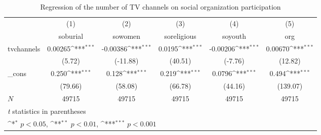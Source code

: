 \begin{table}[htbp]\centering
\def\sym#1{\ifmmode^{#1}\else\(^{#1}\)\fi}
\caption{Regression of the number of TV channels on social organization participation\label{tab5}}
\begin{tabular}{l*{5}{c}}
\hline\hline
            &\multicolumn{1}{c}{(1)}&\multicolumn{1}{c}{(2)}&\multicolumn{1}{c}{(3)}&\multicolumn{1}{c}{(4)}&\multicolumn{1}{c}{(5)}\\
            &\multicolumn{1}{c}{soburial}&\multicolumn{1}{c}{sowomen}&\multicolumn{1}{c}{soreligious}&\multicolumn{1}{c}{soyouth}&\multicolumn{1}{c}{org}\\
\hline
tvchannels  &     0.00265\sym{***}&    -0.00386\sym{***}&      0.0195\sym{***}&    -0.00206\sym{***}&     0.00670\sym{***}\\
            &      (5.72)         &    (-11.88)         &     (40.51)         &     (-7.76)         &     (12.82)         \\
[1em]
\_cons      &       0.250\sym{***}&       0.128\sym{***}&       0.219\sym{***}&      0.0796\sym{***}&       0.494\sym{***}\\
            &     (79.66)         &     (58.08)         &     (66.78)         &     (44.16)         &    (139.07)         \\
\hline
\(N\)       &       49715         &       49715         &       49715         &       49715         &       49715         \\
\hline\hline
\multicolumn{6}{l}{\footnotesize \textit{t} statistics in parentheses}\\
\multicolumn{6}{l}{\footnotesize \sym{*} \(p<0.05\), \sym{**} \(p<0.01\), \sym{***} \(p<0.001\)}\\
\end{tabular}
\end{table}
